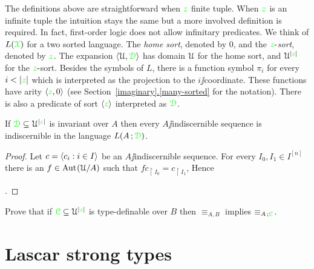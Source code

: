 \documentclass[creche.tex]{subfiles}
\begin{document}
\begin{remark}
The definitions above are straightforward when ${\color{green} z}$ finite tuple. When ${\color{green} z}$ is an infinite tuple the intuition stays the same but a more involved definition is required. In fact, first-order logic does not allow infinitary predicates. We think of $L({\color{green}\EuScript X})$ for a two sorted language. The \textit{home sort}, denoted by $0$, and the ${\color{green} z}\mbox{-}$\textit{sort}, denoted by ${\color{green} z}$. The expansion $\langle\EuScript U,{\color{green}\EuScript D}\rangle$ has domain $\EuScript U$ for the home sort, and $\EuScript U^{|{\color{green} z}|}$ for the ${\color{green} z}\mbox{-}$sort. Besides the symbols of $L$, there is a function symbol $\pi_i$ for every $i<|{\gr z}|$ which is interpreted as the projection to the $i\jj$coordinate. These functions have arity $\langle{\color{green}z},0\rangle$ (see Section~\hyperref[many-sorted]{\ref*{imaginary}.\ref*{many-sorted}} for the notation). There is also a predicate of sort $\langle{\color{green}z}\rangle$ interpreted as ${\color{green}\EuScript D}$.\QED
\end{remark}

\begin{proposition}\label{prop_indiscernible_L(A,D)}
If ${\color{green}\EuScript D}\subseteq\EuScript U^{|{\color{green} z}|}$ is invariant over $A$ then every $A\jj$indiscernible sequence is indiscernible in the language $L(A\,;{\color{green}\EuScript D})$.
\end{proposition}

\begin{proof}
Let $c=\langle c_i:i\in I\rangle$ be an $A\jj$indiscernible sequence. For every $I_0,I_1\in I^{[n]}$ there is an $f\in\textrm{Aut\kern.15ex}(\EuScript U/A)$ such that $fc_{\restriction I_0}=c_{\restriction I_1}$, Hence 

.
\end{proof}



\begin{exercise}
Prove that if ${\color{green}{\color{green}\EuScript C}}\subseteq\EuScript U^{|{\color{green} z}|}$ is type-definable over $B$ then $\equiv_{A,B}$ implies $\equiv_{A\,;{\color{green}\EuScript C}}$.\QED
\end{exercise} 



\section{Lascar strong types}
\label{Lst}
\def\equivL{\stackrel{\smash{\scalebox{.5}{\rm L}}}{\equiv}}
\end{document}
